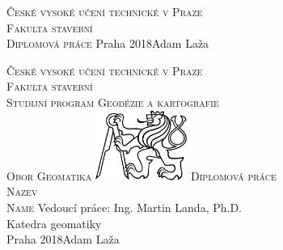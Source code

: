 \begin{center}
\newcommand{\napisCVUT}{České vysoké učení technické v Praze}
\newcommand{\napisFS}{Fakulta stavební}
\newcommand{\napisProgram}{Studijní program Geodézie a kartografie}
\newcommand{\napisObor}{Obor Geomatika}
\newcommand{\napisKatedra}{Katedra geomatiky}
\newcommand{\napisVedouci}{Vedoucí práce: Ing. Martin Landa, Ph.D.}
\newcommand{\napisAutor}{Adam Laža}
\newcommand{\napisDatum}{Praha 2018}
\newcommand{\napisNazevI}{Nazev}
\newcommand{\napisNazevAjI}{Name}
\newcommand{\napisDiplomka}{Diplomová práce}
\newcommand{\napisPraha}{Praha 2018}
%
\newcommand{\velka}[1]{\textsc{#1}}
%
% 
\newif\ifpatitul
\patitultrue

\ifpatitul
{\Large\velka{\napisCVUT}}\\
\velka{\Large\napisFS}\\
\vfill
{\LARGE\velka{\napisDiplomka}}
\vfill
{\large\napisPraha\hfill\napisAutor}
\newpage
\fi%


{\Large\velka{\napisCVUT}}\\
{\Large\velka{\napisFS}}\\
{\Large\velka{\napisProgram}}\\
{\Large\velka{\napisObor}}
\vfill
\includegraphics[width=3cm]{logo_cvut_cb} %
\vfill
{\Large\velka{\napisDiplomka}}\\
\Large\velka{\napisNazevI}\\
\large\velka{\napisNazevAjI}
\vfill
{\large%
\napisVedouci\\
\napisKatedra\\
\bigskip
\napisDatum\hfill\napisAutor}
\end{center}
